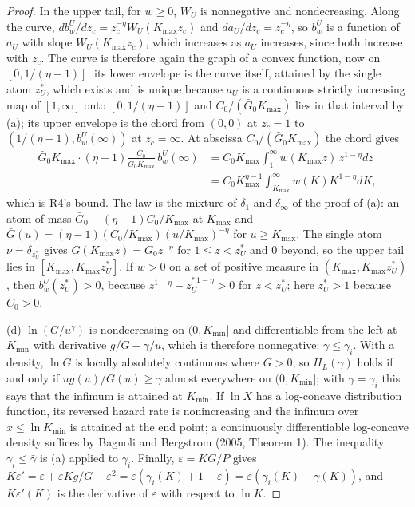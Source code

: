 \documentclass[11pt]{article}
\theoremstyle{remark}
\begin{document}
\begin{proof}
In the upper tail, for $w\ge0$, $W_U$ is nonnegative and nondecreasing. Along the curve, $db^U_w/dz_c=z_c^{-\eta}W_U(K_{\max}z_c)$ and $da_U/dz_c=z_c^{-\eta}$, so $b^U_w$ is a function of $a_U$ with slope $W_U(K_{\max}z_c)$, which increases as $a_U$ increases, since both increase with $z_c$. The curve is therefore again the graph of a convex function, now on $[0,1/(\eta-1)]$: its lower envelope is the curve itself, attained by the single atom $z^*_U$, which exists and is unique because $a_U$ is a continuous strictly increasing map of $[1,\infty]$ onto $[0,1/(\eta-1)]$ and $C_0/(\bar G_0K_{\max})$ lies in that interval by (a); its upper envelope is the chord from $(0,0)$ at $z_c=1$ to $(1/(\eta-1),b^U_w(\infty))$ at $z_c=\infty$. At abscissa $C_0/(\bar G_0K_{\max})$ the chord gives
\begin{align*}
\bar G_0K_{\max}\cdot(\eta-1)\frac{C_0}{\bar G_0K_{\max}}\,b^U_w(\infty)&=C_0K_{\max}\int_1^\infty w(K_{\max}z)\,z^{1-\eta}dz\\
&=C_0K_{\max}^{\eta-1}\int_{K_{\max}}^\infty w(K)K^{1-\eta}dK,
\end{align*}
which is R4's bound. The law is the mixture of $\delta_1$ and $\delta_\infty$ of the proof of (a): an atom of mass $\bar G_0-(\eta-1)C_0/K_{\max}$ at $K_{\max}$ and $\bar G(u)=(\eta-1)(C_0/K_{\max})(u/K_{\max})^{-\eta}$ for $u\ge K_{\max}$. The single atom $\nu=\delta_{z^*_U}$ gives $\bar G(K_{\max}z)=\bar G_0z^{-\eta}$ for $1\le z<z^*_U$ and $0$ beyond, so the upper tail lies in $[K_{\max},K_{\max}z^*_U]$. If $w>0$ on a set of positive measure in $(K_{\max},K_{\max}z^*_U)$, then $b^U_w(z^*_U)>0$, because $z^{1-\eta}-z_U^{*\,1-\eta}>0$ for $z<z^*_U$; here $z^*_U>1$ because $C_0>0$.

(d) $\ln(G/u^\gamma)$ is nondecreasing on $(0,K_{\min}]$ and differentiable from the left at $K_{\min}$ with derivative $g/G-\gamma/u$, which is therefore nonnegative: $\gamma\le\gamma_i$. With a density, $\ln G$ is locally absolutely continuous where $G>0$, so $H_L(\gamma)$ holds if and only if $ug(u)/G(u)\ge\gamma$ almost everywhere on $(0,K_{\min}]$; with $\gamma=\gamma_i$ this says that the infimum is attained at $K_{\min}$. If $\ln X$ has a log-concave distribution function, its reversed hazard rate is nonincreasing and the infimum over $x\le\ln K_{\min}$ is attained at the end point; a continuously differentiable log-concave density suffices by Bagnoli and Bergstrom (2005, Theorem 1). The inequality $\gamma_i\le\bar\gamma$ is (a) applied to $\gamma_i$. Finally, $\varepsilon=KG/P$ gives $K\varepsilon'=\varepsilon+\varepsilon Kg/G-\varepsilon^2=\varepsilon(\gamma_i(K)+1-\varepsilon)=\varepsilon(\gamma_i(K)-\bar\gamma(K))$, and $K\varepsilon'(K)$ is the derivative of $\varepsilon$ with respect to $\ln K$.


\end{proof}
\end{document}

